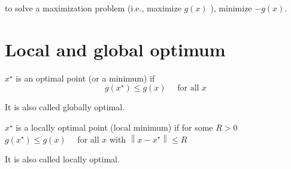 to solve a maximization problem (i.e., maximize $ g(x) $ ), minimize $ -g(x) $.

\section{Local and global optimum}

\begin{definition}
    $ x^{\star} $ is an optimal point (or a minimum) if
$$
g\left(x^{\star}\right) \leq g(x) \quad \text { for all } x
$$

It is also called globally optimal.
\end{definition}

\begin{definition}
    $ x^{\star} $ is a locally optimal point (local minimum) if for some $ R>0 $
$ g\left(x^{\star}\right) \leq g(x) \quad $ for all $ x $ with $ \left\|x-x^{\star}\right\| \leq R $

    It is also called locally optimal.
\end{definition}





